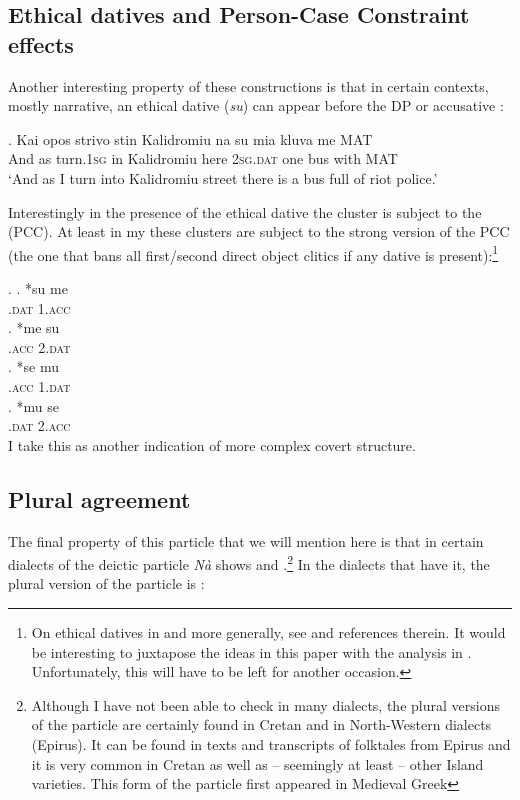 \documentclass[output=paper]{LSP/langsci}
\begin{document}
\subsection{Ethical datives and Person-Case Constraint effects}
Another interesting property of these constructions is that in certain contexts, mostly narrative, an ethical dative  (\textit{su}) can appear before the DP or accusative :

\exg.
Kai opos strivo stin Kalidromiu na su mia kluva me MAT\\
And as turn.1\textsc{sg} in Kalidromiu here 2\textsc{sg}.\textsc{dat} one bus with MAT\\
\glt `And as I turn into Kalidromiu street there is a bus full of riot police.'


Interestingly in the presence of the ethical dative the  cluster is subject to the  (PCC).  At least in my  these  clusters are subject to the strong version of the PCC (the one that bans all first/second  direct object clitics if any dative  is present):\footnote{On ethical datives in  and more generally, see \citet{michelioudakis-kapogianni:13} and references therein.  It would be interesting to juxtapose the ideas in this paper with the analysis in \citet{michelioudakis-kapogianni:13}. Unfortunately, this will have to be left for another occasion.}

\Lsciex.
\ag.
*\na su me\\
.\textsc{dat} 1.\textsc{acc}\\
\bg.
*\na me su\\
.\textsc{acc} 2.\textsc{dat}\\
\cg.
*\na se mu\\
.\textsc{acc} 1.\textsc{dat}\\
\dg.
*\na mu se\\
.\textsc{dat} 2.\textsc{acc}\\


I take this as another indication of more complex covert structure.  

\subsection{Plural agreement}
The final property of this particle that we will mention here is that in certain dialects of  the deictic particle \textit{N\`{a}} shows  and  .\footnote{Although I have not been able to check in many dialects, the plural versions of the particle are certainly found in Cretan  and in North-Western dialects (Epirus).  It can be found in texts and transcripts of folktales from Epirus and it is very common in Cretan  as well as -- seemingly at least -- other Island varieties. This form of the particle first appeared in Medieval Greek}
In the dialects that have it, the plural version of the particle is \textit{\nate}:
\end{document}
